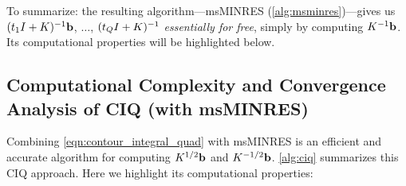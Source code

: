 To summarize: the resulting algorithm---msMINRES (\cref{alg:msminres})---gives us $(t_1 I + K)^{-1} \mathbf{b}$, $\ldots$, $(t_Q I + K)^{-1}$ \emph{essentially for free}, simply by computing $K^{-1} \mathbf{b}$.
Its computational properties will be highlighted below.



\subsection{Computational Complexity and Convergence Analysis of CIQ (with msMINRES)}
Combining \cref{eqn:contour_integral_quad} with msMINRES is an efficient and accurate algorithm for computing $K^{1/2} \mathbf{b}$ and $K^{-1/2} \mathbf{b}$.
\cref{alg:ciq} summarizes this CIQ approach.
Here we highlight its computational properties:

\label{sec:convergence}



